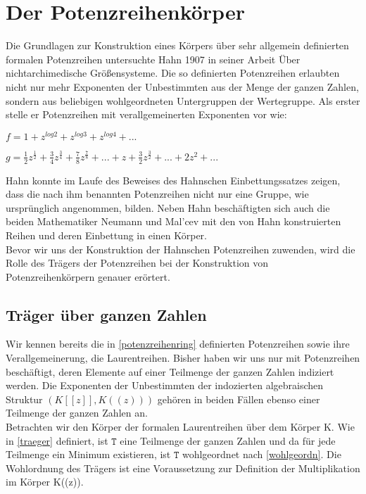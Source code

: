 \section{Der Potenzreihenkörper}
%
Die Grundlagen zur Konstruktion eines Körpers über sehr allgemein definierten formalen Potenzreihen untersuchte Hahn 1907 in seiner Arbeit \glqq Über nichtarchimedische Größensysteme\grqq. Die so definierten Potenzreihen erlaubten nicht nur mehr Exponenten der Unbestimmten aus der Menge der ganzen Zahlen, sondern aus beliebigen wohlgeordneten Untergruppen der Wertegruppe. Als erster stelle er Potenzreihen mit verallgemeinerten Exponenten vor wie:
\centerline{$f = 1 + z^{log 2} + z^{log 3} + z^{log 4} + ... $}
\centerline{$g = \frac{1}{2}z^{\frac{1}{2}} + \frac{3}{4}z^\frac{3}{4} + \frac{7}{8}z^\frac{7}{8} + ... + z + \frac{3}{2}z^\frac{3}{2} + ... + 2z^2 + ...$} 
Hahn konnte im Laufe des Beweises des Hahnschen Einbettungssatzes zeigen, dass die nach ihm benannten Potenzreihen nicht nur eine Gruppe, wie ursprünglich angenommen, bilden. Neben Hahn beschäftigten sich auch die beiden Mathematiker Neumann und Mal'cev mit den von Hahn konstruierten Reihen und deren Einbettung in einen Körper. \\
Bevor wir uns der Konstruktion der Hahnschen Potenzreihen zuwenden, wird die Rolle des Trägers der Potenzreihen bei der Konstruktion von Potenzreihenkörpern genauer erörtert. 

\subsection{Träger über ganzen Zahlen}\label{traegerGanz}
Wir kennen bereits die in \ref{potenzreihenring} definierten Potenzreihen sowie ihre Verallgemeinerung, die Laurentreihen. Bisher haben wir uns nur mit Potenzreihen beschäftigt, deren Elemente auf einer Teilmenge der ganzen Zahlen indiziert werden. Die Exponenten der Unbestimmten der indozierten algebraischen Struktur $\left(K[[z]], K((z))\right) $ gehören in beiden Fällen ebenso einer Teilmenge der ganzen Zahlen an. \\
Betrachten wir den Körper der formalen Laurentreihen über dem Körper K. Wie in \ref{traeger} definiert, ist $\mathtt{T}$ eine Teilmenge der ganzen Zahlen und da für jede Teilmenge ein Minimum existieren, ist $\mathtt{T}$ wohlgeordnet nach \ref{wohlgeordn}. Die Wohlordnung des Trägers ist eine Voraussetzung zur Definition der Multiplikation im Körper K((z)). 
%
%
